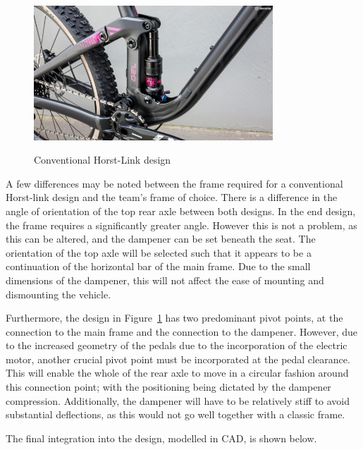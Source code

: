 \documentclass[a4paper,11pt]{article}
\begin{document}
\begin{figure}[!ht]
	\centering
	\includegraphics[width=0.8\textwidth]{horst}
	\caption{Conventional Horst-Link design}
	\cite{stott}
	\label{fig:hor}
\end{figure}

A few differences may be noted between the frame required for a conventional Horst-link design and the team's frame of choice. There is a difference in the angle of orientation of the top rear axle between both designs. In the end design, the frame requires a significantly greater angle. However this is not a problem, as this can be altered, and the dampener can be set beneath the seat. The orientation of the top axle will be selected such that it appears to be a continuation of the horizontal bar of the main frame. Due to the small dimensions of the dampener, this will not affect the ease of mounting and dismounting the vehicle. 

Furthermore, the design in Figure~\ref{fig:hor} has two predominant pivot points, at the connection to the main frame and the connection to the dampener. However, due to the increased geometry of the pedals due to the incorporation of the electric motor, another crucial pivot point must be incorporated at the pedal clearance. This will enable the whole of the rear axle to move in a circular fashion around this connection point; with the positioning being dictated by the dampener compression. Additionally, the dampener will have to be relatively stiff to avoid substantial deflections, as this would not go well together with a classic frame. 

The final integration into the design, modelled in CAD, is shown below.
\end{document}
